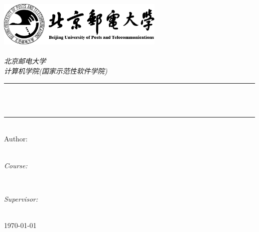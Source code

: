 \setlength{\parskip}{0.5em}

\begin{titlepage}
	\newcommand{\HRule}{\rule{\linewidth}{0.5mm}}
	\includegraphics[width=8cm]{title/logo.png}\\[1cm] 
	\center 
	\quad\\[1.5cm]
	\textsl{\Large 北京邮电大学 }\\[0.5cm] 
	\textsl{\large 计算机学院(国家示范性软件学院)}\\[0.5cm] 
	\makeatletter

	\HRule \\[0.4cm]
	{ \huge \bfseries \@title}\\[0cm] 
	\HRule \\[1.5cm]

	\large Author:\\[0.5cm]
	\large \@author\\[3cm]

	\vfill 
	\begin{minipage}{0.4\textwidth}
		\begin{flushleft} \large
			\emph{Course:}\\
			\Course
		\end{flushleft}
	\end{minipage}
	~
	\begin{minipage}{0.4\textwidth}
		\begin{flushright} \large
			\emph{Supervisor:} \\
			\Supervisor
		\end{flushright}
	\end{minipage}\\[1.5cm]

	\large \today\\[2cm] 
\end{titlepage}
